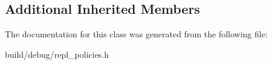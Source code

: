 \subsection*{Additional Inherited Members}


The documentation for this class was generated from the following file\-:\begin{DoxyCompactItemize}
\item 
build/debug/repl\-\_\-policies.\-h\end{DoxyCompactItemize}
